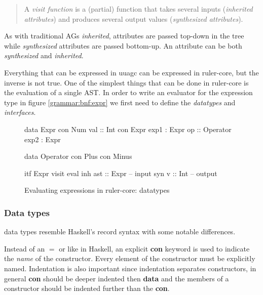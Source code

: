 \begin{quotation}
A \emph{visit function}\cite{visitag} is a (partial) function that takes several inputs (\emph{inherited attributes}) and produces several output values (\emph{synthesized attributes}).
\end{quotation}

As with traditional AGs \emph{inherited}, attributes are passed top-down in the tree while \emph{synthesized} attributes are passed bottom-up. An attribute can be both \emph{synthesized} and \emph{inherited}.

Everything that can be expressed in uuagc can be expressed in ruler-core, but the inverse is not true. One of the simplest things that can be done in ruler-core is the evaluation of a single AST. In order to write an evaluator for the expression type in figure \ref{grammar:bnf:expr} we first need to define the \emph{datatypes} and \emph{interfaces}.

\begin{figure}[H]
\begin{minipage}[t]{0.4\linewidth}
\begin{code}
data Expr
  con Num
    val     :: Int
  con Expr
    exp1    :  Expr
    op      :: Operator
    exp2    :  Expr
\end{code}
\end{minipage}
\begin{minipage}[t]{0.6\linewidth}
\begin{code}
data Operator
  con Plus
  con Minus

itf Expr
  visit eval
    inh ast  :: Expr -- input
    syn v    :: Int  -- output
\end{code}
\end{minipage}
\caption{Evaluating expressions in ruler-core: datatypes}
\label{example:tutorial1:datatypes}
\end{figure}

\subsubsection{Data types}
\Rcore data types resemble Haskell's record syntax with some notable differences.

Instead of an $=$ or \textbar \space like in Haskell, an explicit \textbf{con} keyword is used to indicate the \emph{name} of the constructor. Every element of the constructor must be explicitly named. Indentation is also important since indentation separates constructors, in general \textbf{con} should be deeper indented then \textbf{data} and the members of a constructor should be indented further than the \textbf{con}. 


